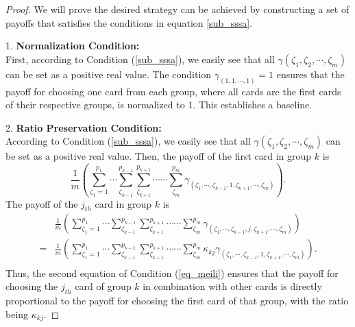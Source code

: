 \documentclass{article}
\newtheorem{proof}{Proof}
\begin{document}
\begin{proof}
We will prove the desired strategy can be achieved by constructing a set of payoffs that satisfies the conditions in equation \eqref{sub_sssa}.

1. \textbf{Normalization Condition:} \\
First, according to Condition (\ref{sub_sssa}), we easily see that all $\gamma(\zeta_1, \zeta_2, \cdots, \zeta_m)$ can be set as a positive real value.
The condition $\gamma_{(1, 1, \cdots, 1)} = 1$ ensures that the payoff for choosing one card from each group, where all cards are the first cards of their respective groups, is normalized to 1. This establishes a baseline.

2. \textbf{Ratio Preservation Condition:} \\
According to Condition (\ref{sub_sssa}), we easily see that all $\gamma(\zeta_1, \zeta_2, \cdots, \zeta_m)$ can be set as a positive real value.
Then, the payoff of the first card in group $k$ is
$$
\frac{1}{m}(\sum_{\zeta_1=1}^{p_1} \cdots \sum_{\zeta_{k-1}}^{p_{k-1}} \sum_{\zeta_{k+1}}^{p_{k+1}} \cdots \cdots \sum_{\zeta_m}^{p_m} \gamma_{( \zeta_1, \cdots, \zeta_{k-1}, 1, \zeta_{k+1}, \cdots, \zeta_m )}).
$$
The payoff of the $j_{th}$ card in group $k$ is
\begin{equation}\label{eq_meili}
\begin{aligned}
&\frac{1}{m}(\sum_{\zeta_1=1}^{p_1} \cdots \sum_{\zeta_{k-1}}^{p_{k-1}} \sum_{\zeta_{k+1}}^{p_{k+1}} \cdots \cdots \sum_{\zeta_m}^{p_m} \gamma_{( \zeta_1, \cdots, \zeta_{k-1}, j, \zeta_{k+1}, \cdots, \zeta_m )})\\
=&\frac{1}{m}(\sum_{\zeta_1=1}^{p_1} \cdots \sum_{\zeta_{k-1}}^{p_{k-1}} \sum_{\zeta_{k+1}}^{p_{k+1}} \cdots \cdots \sum_{\zeta_m}^{p_m} \kappa_{k j} \gamma_{( \zeta_1, \cdots, \zeta_{k-1}, 1, \zeta_{k+1}, \cdots, \zeta_m )}).\\
\end{aligned}
\end{equation}
Thus, the second equation of Condition (\ref{eq_meili}) ensures that the payoff for choosing the $j_{th}$ card of group $k$ in combination with other cards is directly proportional to the payoff for choosing the first card of that group, with the ratio being $\kappa_{kj}$.

\end{proof}
\end{document}
